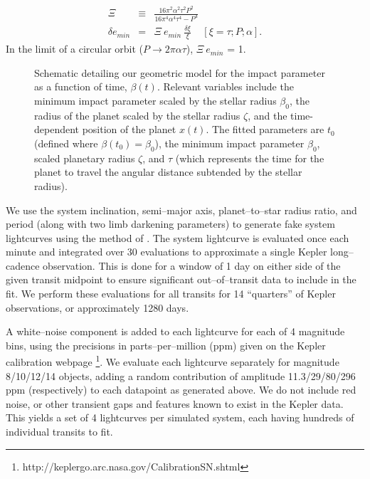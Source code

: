 \begin{eqnarray}
\Xi & \equiv & \frac{16 \pi^{2} \alpha^{2} \tau^{2} P^{2}}{16 \pi^{4} \alpha^{4} \tau^{4} - P^{4}} \\
\delta e_{min} & = & \Xi~e_{min}~\frac{\delta \xi}{\xi} ~~~~~ \left[\xi = \tau; P; \alpha \right].\nonumber
\end{eqnarray}
In the limit of a circular orbit ($P \rightarrow 2 \pi \alpha \tau$),
$\Xi~e_{min}$ = 1.

\begin{figure}[t] 
\begin{center} 
\caption{Schematic detailing our geometric model for the impact
  parameter as a function of time, $\beta(t)$.  Relevant variables
  include the minimum impact parameter scaled by the stellar radius
  $\beta_0$, the radius of the planet scaled by the stellar radius
  $\zeta$, and the time-dependent position of the planet $x(t)$.  The
  fitted parameters are $t_0$ (defined where $\beta(t_0) = \beta_0$),
  the minimum impact parameter $\beta_0$, scaled planetary radius
  $\zeta$, and $\tau$ (which represents the time for the planet to
  travel the angular distance subtended by the stellar radius). }
\label{fig-schem} 
\end{center} 
\end{figure}


\medskip
{\centerline{}}
\smallskip


We use the system inclination, semi--major axis, planet--to--star
radius ratio, and period (along with two limb darkening parameters) to
generate fake system lightcurves using the method of
\cite{2002ApJ...580L.171M}.  The system lightcurve is evaluated once
each minute and integrated over 30 evaluations to approximate a single
Kepler long--cadence observation.  This is done for a window of 1 day
on either side of the given transit midpoint to ensure significant
out--of--transit data to include in the fit.  We perform these
evaluations for all transits for 14 ``quarters'' of Kepler
observations, or approximately 1280 days.

A white--noise component is added to each lightcurve for each of 4
magnitude bins, using the precisions in parts--per--million (ppm)
given on the Kepler calibration
webpage \footnote{http://keplergo.arc.nasa.gov/CalibrationSN.shtml}.
We evaluate each lightcurve separately for magnitude 8/10/12/14
objects, adding a random contribution of amplitude 11.3/29/80/296 ppm
(respectively) to each datapoint as generated above.  We do not
include red noise, or other transient gaps and features known to exist
in the Kepler data.  This yields a set of 4 lightcurves per simulated
system, each having hundreds of individual transits to fit.

